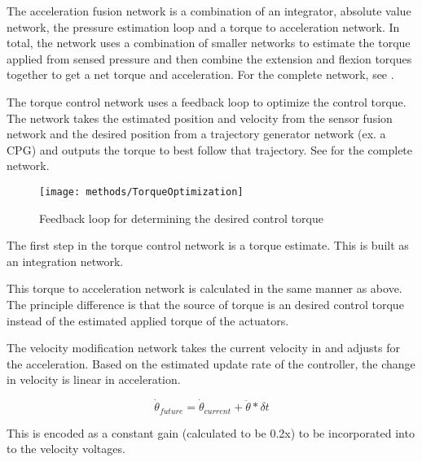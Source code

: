 
The acceleration fusion network is a combination of an integrator, absolute
value network, the pressure estimation loop and a torque to acceleration
network. In total, the network uses a combination of smaller networks to
estimate the torque applied from sensed pressure and then combine the extension
and flexion torques together to get a net torque and acceleration. For the complete network, see .


The torque control network uses a feedback loop to optimize the
control torque. The network takes the estimated position and velocity from the 
sensor fusion network and the desired position from a trajectory generator
network (ex. a CPG) and outputs the torque to best follow that trajectory.
See  for the complete network.

\begin{figure}
\centering
\texttt{[image: methods/TorqueOptimization]}
\caption{Feedback loop for determining the desired control torque}
\label{fig:TorqueOptimizationNetwork}
\end{figure}



The first step in the torque control network is a torque estimate. This is built
as an integration network.


This torque to acceleration network is calculated in the same manner as above.
The principle difference is that the source of torque is an desired control
torque instead of the estimated applied torque of the actuators.


The velocity modification network takes the current velocity in and adjusts for
the acceleration. Based on the estimated update rate of the controller, the
change in velocity is linear in acceleration.

\begin{equation}
\dot{\theta}_{future} = \dot{\theta}_{current} + \ddot{\theta} * \delta t
\end{equation}

This is encoded as a constant gain (calculated to be 0.2x) to be incorporated 
into to the velocity voltages.

